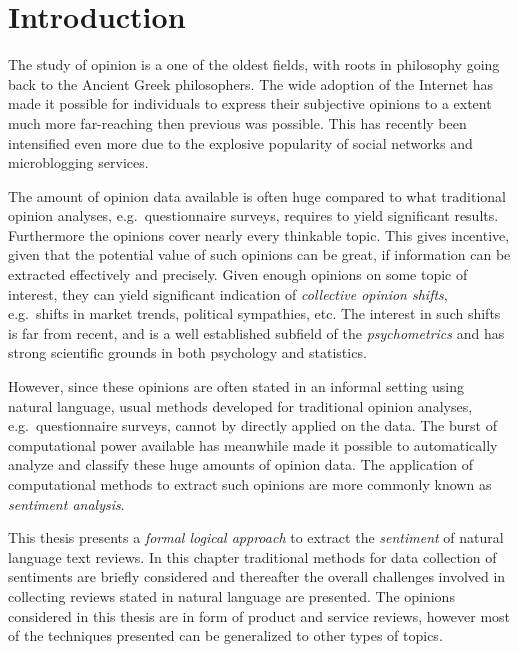 
\chapter{Introduction}
The study of opinion is a one of the oldest fields, with roots in philosophy going back to the Ancient Greek philosophers. The wide adoption of the Internet has made it possible for individuals to express their subjective opinions to a extent much more far-reaching then previous was possible. This has recently been intensified even more due to the explosive popularity of social networks and microblogging services. 

The amount of opinion data available is often huge compared to what traditional opinion analyses, e.g.\ questionnaire surveys, requires to yield significant results. Furthermore the opinions cover nearly every thinkable topic. This gives incentive, given that the potential value of such opinions can be great, if information can be extracted effectively and precisely. Given enough opinions on some topic of interest, they can yield significant indication of \emph{collective opinion shifts}, e.g.\ shifts in market trends, political sympathies, etc. 
The interest in such shifts is far from recent, and is a well established subfield of the \emph{psychometrics} and has strong scientific grounds in both psychology and statistics. 

However, since these opinions are often stated in an informal setting using natural language, usual methods developed for traditional opinion analyses, e.g.\ questionnaire surveys, cannot by directly applied on the data. The burst of computational power available has meanwhile made it possible to automatically analyze and classify these huge amounts of opinion data. The application of computational methods to extract such opinions are more commonly known as \emph{sentiment analysis}.

This thesis presents a \emph{formal logical approach} to extract the \emph{sentiment} of natural language text reviews. In this chapter traditional methods for data collection of sentiments are briefly considered and thereafter the overall challenges involved in collecting reviews stated in natural language are presented. The opinions considered in this thesis are in form of product and service reviews, however most of the techniques presented can be generalized to other types of topics.

